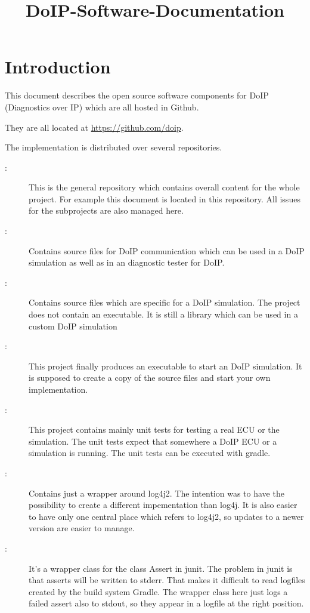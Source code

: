 \documentclass[a4paper]{doipdoc}
\title{DoIP-Software-Documentation}
\begin{document}
\maketitle

\tableofcontents

\section{Introduction}

	This document describes the open source software components for
	DoIP (Diagnostics over IP) which are all hosted in Github.

	They are all located at \url{https://github.com/doip}.

	The implementation is distributed over several repositories.
	
	\begin{description}
		
		\item[:] This is the general repository which contains
		overall content for the whole project. For example this document
		is located in this repository. All issues for the subprojects
		are also managed here. 

		\item[:] Contains source files for DoIP
		communication which can be used in a DoIP simulation as well as
		in an diagnostic tester for DoIP.

		\item[:] Contains source files which are
		specific for a DoIP simulation. The project does not contain an
		executable. It is still a library which can be used in a custom
		DoIP simulation

		\item[:] This project finally produces
		an executable to start an DoIP simulation. It is supposed to create 
		a copy of the source files and start your own implementation.

		\item[:] This project contains mainly unit tests
		for testing a real ECU or the simulation. The unit tests expect
		that somewhere a DoIP ECU or a simulation is running. The unit tests
		can be executed with gradle.

		\item[:] Contains just a wrapper around 
		log4j2. The intention was to have the possibility to create
		a different impementation than log4j. It is also easier to
		have only one central place which refers to log4j2, so updates 
		to a newer version are easier to manage.

		\item[:] It's a wrapper class for the class
		Assert in junit. The problem in junit is that asserts will be written
		to stderr. That makes it difficult to read logfiles created
		by the build system Gradle. The wrapper class here just logs
		a failed assert also to stdout, so they appear in a logfile at
		the right position.

	\end{description}
\end{document}
